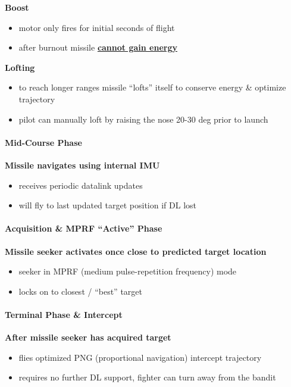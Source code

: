 \textbf{Boost}

\begin{itemize}
    \item motor only fires for initial seconds of flight 
    \item after burnout missile \textbf{\underline{cannot gain energy}}
\end{itemize}

\textbf{Lofting} 

\begin{itemize}
    \item to reach longer ranges missile ``lofts'' itself to conserve energy \& optimize trajectory
    \item pilot can manually loft by raising the nose 20-30 deg prior to launch
\end{itemize}

\clearpage

\paragraph{Mid-Course Phase}
\textbf{Missile navigates using internal IMU}

\begin{itemize}
    \item receives periodic datalink updates
    \item will fly to last updated target position if DL lost
\end{itemize}
\paragraph{Acquisition \& MPRF ``Active'' Phase}
\textbf{Missile seeker activates once close to predicted target location}
\begin{itemize}
    \item seeker in MPRF (medium pulse-repetition frequency) mode 
    \item locks on to closest / ``best'' target
\end{itemize}
\paragraph{Terminal Phase \& Intercept}
\textbf{After missile seeker has acquired target}
\begin{itemize}
    \item flies optimized PNG (proportional navigation) intercept trajectory
    \item requires no further DL support, fighter can turn away from the bandit
\end{itemize}

